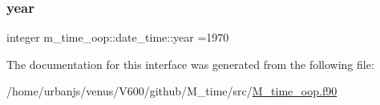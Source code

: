 \subsubsection{\texorpdfstring{year}{year}}
{\footnotesize\ttfamily integer m\+\_\+time\+\_\+oop\+::date\+\_\+time\+::year =1970\hspace{0.3cm}{\ttfamily [private]}}



The documentation for this interface was generated from the following file\+:\begin{DoxyCompactItemize}
\item 
/home/urbanjs/venus/\+V600/github/\+M\+\_\+time/src/\mbox{\hyperlink{M__time__oop_8f90}{M\+\_\+time\+\_\+oop.\+f90}}\end{DoxyCompactItemize}
